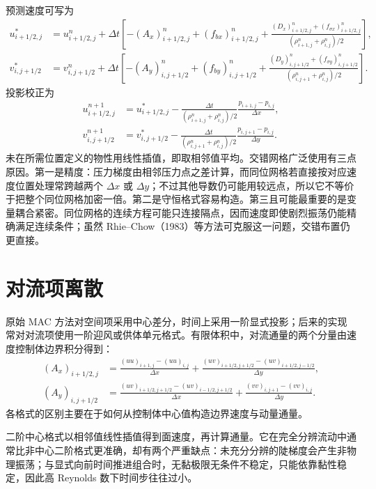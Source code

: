 \documentclass[11pt,a4paper,openany,fontset=none]{ctexbook}
\begin{document}
预测速度可写为
\begin{align}
 u_{i+1/2,j}^*&=u_{i+1/2,j}^n+\Delta t\left[-(A_x)^n_{i+1/2,j}+(f_{bx})^n_{i+1/2,j}
 +\frac{(D_x)^n_{i+1/2,j}+(f_{\sigma x})^n_{i+1/2,j}}{(\rho_{i+1,j}^n+\rho_{i,j}^n)/2}\right], \tag{3.26}\\
 v_{i,j+1/2}^*&=v_{i,j+1/2}^n+\Delta t\left[-(A_y)^n_{i,j+1/2}+(f_{by})^n_{i,j+1/2}
 +\frac{(D_y)^n_{i,j+1/2}+(f_{\sigma y})^n_{i,j+1/2}}{(\rho_{i,j+1}^n+\rho_{i,j}^n)/2}\right]. \tag{3.27}
\end{align}
投影校正为
\begin{align}
 u_{i+1/2,j}^{n+1}&=u_{i+1/2,j}^*-
 \frac{\Delta t}{(\rho_{i+1,j}^n+\rho_{i,j}^n)/2}\frac{p_{i+1,j}-p_{i,j}}{\Delta x}, \tag{3.28}\\
 v_{i,j+1/2}^{n+1}&=v_{i,j+1/2}^*-
 \frac{\Delta t}{(\rho_{i,j+1}^n+\rho_{i,j}^n)/2}\frac{p_{i,j+1}-p_{i,j}}{\Delta y}. \tag{3.29}
\end{align}
未在所需位置定义的物性用线性插值，即取相邻值平均。交错网格广泛使用有三点原因。第一是精度：压力梯度由相邻压力点之差计算，而同位网格若直接按对应速度位置处理常跨越两个 $\Delta x$ 或 $\Delta y$；不过其他导数仍可能用较远点，所以它不等价于把整个同位网格加密一倍。第二是守恒格式容易构造。第三且可能最重要的是变量耦合紧密。同位网格的连续方程可能只连接隔点，因而速度即使剧烈振荡仍能精确满足连续条件；虽然 Rhie--Chow（1983）等方法可克服这一问题，交错布置仍更直接。

\section{对流项离散}

原始 MAC 方法对空间项采用中心差分，时间上采用一阶显式投影；后来的实现常对对流项使用一阶迎风或供体单元格式。有限体积中，对流通量的两个分量由速度控制体边界积分得到：
\begin{align}
 (A_x)_{i+1/2,j}&=\frac{(uu)_{i+1,j}-(uu)_{i,j}}{\Delta x}
 +\frac{(uv)_{i+1/2,j+1/2}-(uv)_{i+1/2,j-1/2}}{\Delta y}, \tag{3.30}\\
 (A_y)_{i,j+1/2}&=\frac{(uv)_{i+1/2,j+1/2}-(uv)_{i-1/2,j+1/2}}{\Delta x}
 +\frac{(vv)_{i,j+1}-(vv)_{i,j}}{\Delta y}. \tag{3.31}
\end{align}
各格式的区别主要在于如何从控制体中心值构造边界速度与动量通量。

二阶中心格式以相邻值线性插值得到面速度，再计算通量。它在完全分辨流动中通常比非中心二阶格式更准确，却有两个严重缺点：未充分分辨的陡梯度会产生非物理振荡；与显式向前时间推进组合时，无黏极限无条件不稳定，只能依靠黏性稳定，因此高 Reynolds 数下时间步往往过小。
\end{document}
